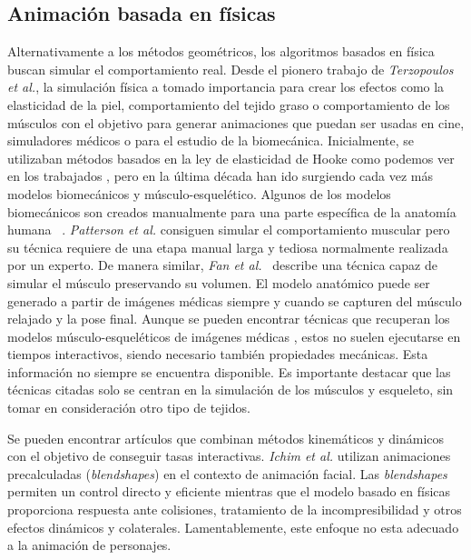 \subsection{Animación basada en físicas}

Alternativamente a los métodos geométricos, los algoritmos basados en física buscan simular el comportamiento real. Desde el pionero trabajo de \emph{Terzopoulos et al.}\cite{terzopoulos1987elastically}, la simulación física a tomado importancia para crear los efectos como la elasticidad de la piel, comportamiento del tejido graso o comportamiento de los músculos con el objetivo para generar animaciones que puedan ser usadas en cine, simuladores médicos o para el estudio de la biomecánica. 
Inicialmente, se utilizaban métodos basados en la ley de elasticidad de Hooke como podemos ver en los trabajados \cite{russell93,wilhelms1995modeling}, pero en la última década han ido surgiendo cada vez más modelos biomecánicos y músculo-esquelético. Algunos de los modelos biomecánicos son creados manualmente para una parte específica de la anatomía humana ~\cite{Lee2009}. \emph{Patterson et al.} \cite{Patterson2012} consiguen simular el comportamiento muscular pero su técnica requiere de una etapa manual larga y tediosa normalmente realizada por un experto. De manera similar, \emph{Fan et al.}~ \cite{Fan2014} describe una técnica capaz de simular el músculo preservando su volumen. El modelo anatómico puede ser generado a partir de imágenes médicas siempre y cuando se capturen del músculo relajado y la pose final. Aunque se pueden encontrar técnicas que recuperan los modelos músculo-esqueléticos de imágenes médicas \cite{blemker2007, gilles2010, schmid2009}, estos no suelen ejecutarse en tiempos interactivos, siendo necesario también propiedades mecánicas. Esta información no siempre se encuentra disponible. Es importante destacar que las técnicas citadas solo se centran en la simulación de los músculos y esqueleto, sin tomar en consideración otro tipo de tejidos.

Se pueden encontrar artículos que combinan métodos kinemáticos y dinámicos con el objetivo de conseguir tasas interactivas.  \emph{Ichim et al.} \cite{Ichim:2016} utilizan animaciones precalculadas (\emph{blendshapes}) en el contexto de animación facial. Las \emph{blendshapes} permiten un control directo y eficiente mientras que el modelo basado en físicas proporciona respuesta ante colisiones, tratamiento de la incompresibilidad y otros efectos dinámicos y colaterales. Lamentablemente, este enfoque no esta adecuado a la animación de personajes. 


